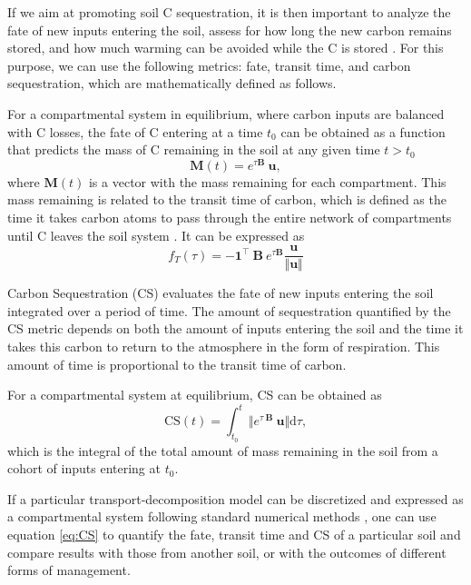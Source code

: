 \documentclass[11pt, oneside, a4paper]{article}   	%
\begin{document}
If we aim at promoting soil C sequestration, it is then important to analyze the fate of new inputs entering the soil, assess for how long the new carbon remains stored, and how much warming can be avoided while the C is stored \citep{Sierra2021BGS, Crow2022}. For this purpose, we can use the following metrics: fate, transit time, and carbon sequestration, which are mathematically defined as follows.

For a compartmental system in equilibrium, where carbon inputs are balanced with C losses, the fate of C entering at a time $t_0$ can be obtained as a function that predicts the mass of C remaining in the soil at any given time $t > t_0$ \citep{Sierra2021JE}
\begin{equation}
\bm{M}(t) = e^{\tau \mathbf{B}} \ \bm{u},
\end{equation}
where $\bm{M}(t)$ is a vector with the mass remaining for each compartment. This mass remaining is related to the transit time of carbon, which is defined as the time it takes carbon atoms to pass through the entire network of compartments until C leaves the soil system \citep{Bolin1973, Manzoni2009JGR, Sierra2018JAMES}. It can be expressed as \citep{Metzler2018MG}
\begin{equation} \label{eq:transitTime}
f_T(\tau) = -\bm{1}^{\top} \ \mathbf{B} \ e^{\tau \mathbf{B}} \frac{\bm{u}}{\Vert \bm{u} \Vert}
\end{equation}

Carbon Sequestration (CS) evaluates the fate of new inputs entering the soil integrated over a period of time. The amount of sequestration quantified by the CS metric depends on both the amount of inputs entering the soil and the time it takes this carbon to return to the atmosphere in the form of respiration. This amount of time is proportional to the transit time of carbon. 


For a compartmental system at equilibrium, CS can be obtained as
\begin{equation} \label{eq:CS}
 \mathrm{CS}(t) = \int_{t_0}^t \Vert e^{\tau \ \mathbf{B}} \ \bm{u} \Vert \mathrm{d} \tau,
\end{equation}
which is the integral of the total amount of mass remaining in the soil from a cohort of inputs entering at $t_0$.

If a particular transport-decomposition model can be discretized and expressed as a compartmental system following standard numerical methods \citep{LeVeque2007, Lanczos}, one can use equation \ref{eq:CS} to quantify the fate, transit time and CS of a particular soil and compare results with those from another soil, or with the outcomes of different forms of management. 
\end{document}
